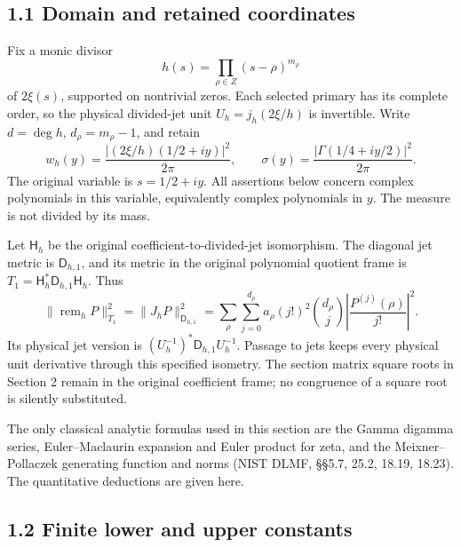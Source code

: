 \subsection{1.1 Domain and retained coordinates}\label{domain-and-retained-coordinates}

Fix a monic divisor \[
h(s)=\prod_{\rho\in Z}(s-\rho)^{m_\rho}
\] of \(2\xi(s)\), supported on nontrivial zeros. Each selected primary has its complete order, so the physical divided-jet unit \(U_h=j_h(2\xi/h)\) is invertible. Write \(d=\deg h\), \(d_\rho=m_\rho-1\), and retain \[
w_h(y)=\frac{|(2\xi/h)(1/2+iy)|^2}{2\pi},\qquad
\sigma(y)=\frac{|\Gamma(1/4+iy/2)|^2}{2\pi}.
\] The original variable is \(s=1/2+iy\). All assertions below concern complex polynomials in this variable, equivalently complex polynomials in \(y\). The measure is not divided by its mass.

Let \(\mathsf H_h\) be the original coefficient-to-divided-jet isomorphism. The diagonal jet metric is \(\mathsf D_{h,1}\), and its metric in the original polynomial quotient frame is \(T_1=\mathsf H_h^*\mathsf D_{h,1}\mathsf H_h\). Thus \[
\|\operatorname{rem}_hP\|_{T_1}^2
=\|J_hP\|_{\mathsf D_{h,1}}^2
 =\sum_{\rho}\sum_{j=0}^{d_\rho}
 a_\rho(j!)^2\binom{d_\rho}{j}
 \left|\frac{P^{(j)}(\rho)}{j!}\right|^2.
\] Its physical jet version is \((U_h^{-1})^*\mathsf D_{h,1}U_h^{-1}\). Passage to jets keeps every physical unit derivative through this specified isometry. The section matrix square roots in Section 2 remain in the original coefficient frame; no congruence of a square root is silently substituted.

The only classical analytic formulas used in this section are the Gamma digamma series, Euler--Maclaurin expansion and Euler product for zeta, and the Meixner--Pollaczek generating function and norms (NIST DLMF, §§5.7, 25.2, 18.19, 18.23). The quantitative deductions are given here.

\subsection{1.2 Finite lower and upper constants}\label{finite-lower-and-upper-constants}

